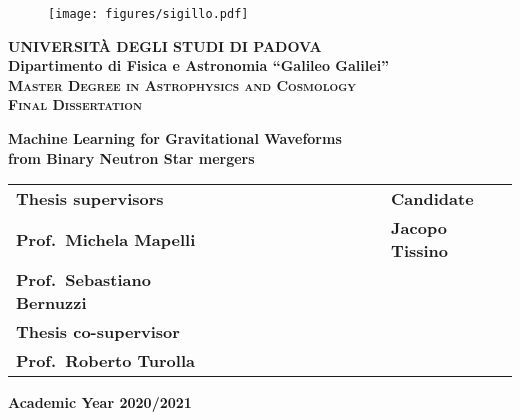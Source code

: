 \documentclass[a4paper,11pt]{book}
\begin{document}
\frontmatter
\begin{titlepage}
\vspace{5mm}
\begin{figure}[hbtp]
\centering
\texttt{[image: figures/sigillo.pdf]}
\end{figure}
\vspace{5mm}
\begin{center}
{{\huge{\textsc{\bf UNIVERSIT\`A DEGLI STUDI DI PADOVA}}}\\}
\vspace{5mm}
{\Large{\bf Dipartimento di Fisica e Astronomia ``Galileo Galilei''}} \\
\vspace{5mm}
{\Large{\textsc{\bf Master Degree in Astrophysics and Cosmology}}}\\
\vspace{15mm}
{\Large{\textsc{\bf Final Dissertation}}}\\
\vspace{20mm}
\begin{spacing}{3}
{\LARGE \textbf{Machine Learning for Gravitational Waveforms \\ from Binary Neutron Star mergers}}\\
\end{spacing}
\vspace{8mm}
\end{center}

\vspace{5mm}
\begin{spacing}{2}
\begin{tabular}{ l  c  c c  c c c c c c c  l }
{\Large{\bf Thesis supervisors}} &&&&&&&&&&& {\Large{\bf Candidate}}\\
{\Large{\bf Prof.\ Michela Mapelli }} &&&&&&&&&&& {\Large{\bf Jacopo Tissino}}\\
{\Large{\bf Prof.\ Sebastiano Bernuzzi}}\\
{\Large{\bf Thesis co-supervisor}}\\
{\Large{\bf Prof.\ Roberto Turolla}}\\
\end{tabular}
\end{spacing}
\vspace{15 mm}

\begin{center}
{\Large{\bf Academic Year 2020/2021}}
\end{center}
\end{titlepage}
\end{document}
